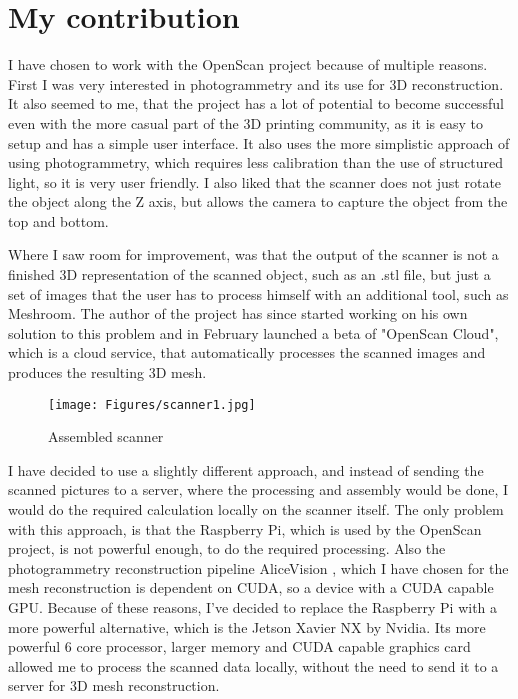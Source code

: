 \chapter{My contribution}
\label{sec:contribution}
I have chosen to work with the OpenScan project because of multiple reasons.
First I was very interested in photogrammetry and its use for 3D reconstruction.
It also seemed to me, that the project has a lot of potential to become successful even with the more casual part of the 3D printing community, as it is easy to setup and has a simple user interface.
It also uses the more simplistic approach of using photogrammetry, which requires less calibration than the use of structured light, so it is very user friendly.
I also liked that the scanner does not just rotate the object along the Z axis, but allows the camera to capture the object from the top and bottom.

Where I saw room for improvement, was that the output of the scanner is not a finished 3D representation of the scanned object, such as an .stl file, but just a set of images that the user has to process himself with an additional tool, such as Meshroom.
The author of the project has since started working on his own solution to this problem and in February launched a beta of "OpenScan Cloud", which is a cloud service, that automatically processes the scanned images and produces the resulting 3D mesh. \cite{openscanCloud}

\begin{figure}[h!]
	\centering
	\texttt{[image: Figures/scanner1.jpg]}	
	\caption{Assembled scanner}
\end{figure}

I have decided to use a slightly different approach, and instead of sending the scanned pictures to a server, where the processing and assembly would be done, I would do the required calculation locally on the scanner itself.
The only problem with this approach, is that the Raspberry Pi, which is used by the OpenScan project, is not powerful enough, to do the required processing.
Also the photogrammetry reconstruction pipeline AliceVision \cite{Moulon2012, Jancosek2011}, which I have chosen for the mesh reconstruction is dependent on CUDA, so a device with a CUDA capable GPU.
Because of these reasons, I've decided to replace the Raspberry Pi with a more powerful alternative, which is the Jetson Xavier NX by Nvidia.
Its more powerful 6 core processor, larger memory and CUDA capable graphics card allowed me to process the scanned data locally, without the need to send it to a server for 3D mesh reconstruction.


